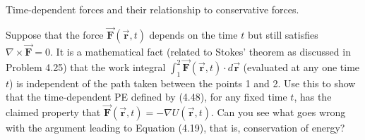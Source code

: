 \documentclass[11pt,letterpaper,boxed]{../hmcpsetrhino}
\let\oldvec\vec
\renewcommand{\vec}[1]{\oldvec{\mathbf{#1}}}
\begin{document}
\begin{solution}

\vfill
\end{solution}


\newpage

\begin{problem}[iii]
Time-dependent forces and their relationship to conservative forces.

\begin{problem}[4.27]
Suppose that the force $\vec F(\vec r, t)$ depends on the time $t$ but still satisfies $\nabla \times \vec F = 0$. It is a mathematical fact (related to Stokes' theorem as discussed in Problem 4.25) that the work integral $\int_1^2 \vec F(\vec r, t) \cdot d\vec r$ (evaluated at any one time $t$) is independent of the path taken between the points 1 and 2. Use this to show that the time-dependent PE defined by (4.48), for any fixed time $t$, has the claimed property that $\vec F(\vec r, t) = - \nabla U(\vec r, t)$. Can you see what goes wrong with the argument leading to Equation (4.19), that is, conservation of energy?
\end{problem}
\end{problem}

\begin{solution}

\vfill
\end{solution}
\end{document}
